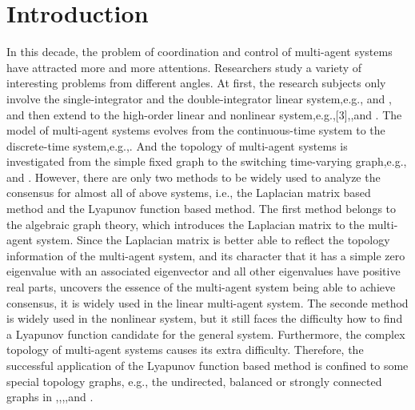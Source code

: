\documentclass[english]{cccconf}
\begin{document}
\section{Introduction}
In this decade, the problem of coordination and control of multi-agent systems have attracted more and more attentions.  Researchers study a variety of interesting problems from different angles. At first, the research subjects only involve the single-integrator and the double-integrator linear system,e.g.,\cite{Ren2008} and \cite{Mesbahi2010}, and then extend to the high-order linear and nonlinear system,e.g.,[3],\cite{Kim2011},and \cite{Xi2012}. The model of multi-agent systems evolves from the continuous-time system to the discrete-time system,e.g.,\cite{Su2012}. And the topology of multi-agent systems is investigated from the simple fixed graph to the switching time-varying graph,e.g.,\cite{Ren2005} and \cite{Olfati2004}. However, there are only two methods to be widely used to analyze the consensus for  almost all of above systems, i.e., the Laplacian matrix  based method and the Lyapunov function based method. The first method belongs to the algebraic graph theory, which introduces the Laplacian matrix  to the multi-agent system. Since the Laplacian matrix  is better able to reflect the topology information of the multi-agent system, and its character that it has a simple zero eigenvalue with an associated eigenvector   and all other eigenvalues have positive real parts\cite{Ren2008}, uncovers the essence of the multi-agent system being able to achieve consensus, it is widely used in the linear multi-agent system.  The seconde method is widely used in the nonlinear system, but it still faces the difficulty how to  find a  Lyapunov function candidate for the general system. Furthermore,  the complex topology of multi-agent systems causes  its extra difficulty. Therefore, the successful application of the Lyapunov function based method is confined to some special topology graphs, e.g., the undirected, balanced or strongly connected graphs in \cite{Chopra2012},\cite{Listmann2009},\cite{Das2010},\cite{Nosrati2012},and \cite{Yu2011}.
\end{document}
